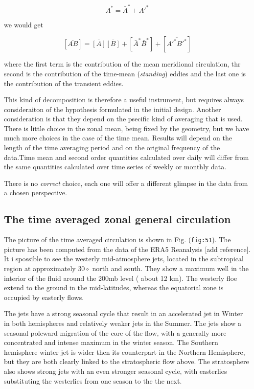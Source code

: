 \[A^* =    \bar{A}^* + A'^*\]

we would get

\[[ \overline{AB}] = \bar{[A]}\bar{[B]} +  [\bar{A}^*\bar{B}^*]+[\overline{A'^*B'^*} ]\]

where the first term is the contribution of the mean meridional
circulation, thr second is the contribution of the time-mean
(\emph{standing}) eddies and the last one is the contribution of the
transient eddies.

This kind of decomposition is therefore a useful instrument, but
requires always consideraiton of the hypothesis formulated in the
initial design. Another consideration is that they depend on the
psecific kind of averaging that is used. There is little choice in the
zonal mean, being fixed by the geometry, but we have much more choices
in the case of the time mean. Results will depend on the length of the
time averaging period and on the original frequency of the data.Time
mean and second order quantities calculated over daily will differ from
the same quantities calculated over time series of weekly or monthly
data.

There is no \emph{correct} choice, each one will offer a different
glimpse in the data from a chosen perspective.

\subsection{The time averaged zonal general
circulation}\label{the-time-averaged-zonal-general-circulation}

The picture of the time averaged circulation is shown in Fig.
(\texttt{fig:51}). The picture has been computed from the data of the
ERA5 Reanalysis {[}add reference{]}. It i spossible to see the westerly
mid-atmosphere jets, located in the subtropical region at approximately
\(30\circ\) north and south. They show a maximum well in the interior of
the fluid around the 200mb level ( about 12 km). The westerly floe
extend to the ground in the mid-latitudes, whereas the equatorial zone
is occupied by easterly flows.

The jets have a strong seasonal cycle that result in an accelerated jet
in Winter in both hemispheres and relatively weaker jets in the Summer.
The jets show a seasonal poleward migration of the core of the flow,
with a generally more concentrated and intense maximum in the winter
season. The Southern hemisphere winter jet is wider then its counterpart
in the Northern Hemisphere, but they are both clearly linked to the
stratospheric flow above. The stratosphere also shows strong jets with
an even stronger seasonal cycle, with easterlies substituting the
westerlies from one season to the the next.

